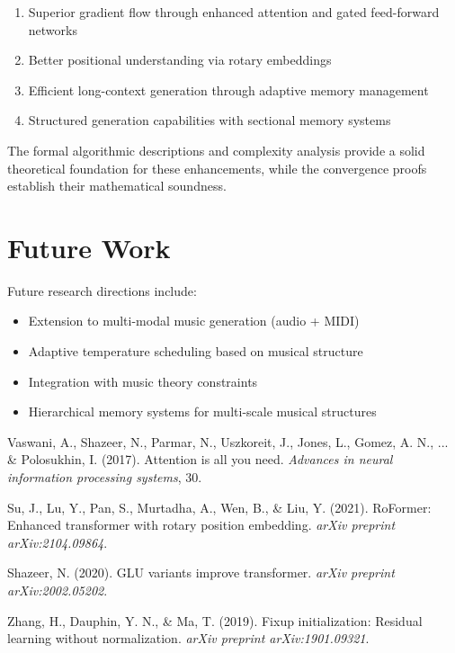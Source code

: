 \documentclass[12pt]{article}
\theoremstyle{definition}
\begin{document}
\begin{enumerate}
\item Superior gradient flow through enhanced attention and gated feed-forward networks
\item Better positional understanding via rotary embeddings
\item Efficient long-context generation through adaptive memory management
\item Structured generation capabilities with sectional memory systems
\end{enumerate}

The formal algorithmic descriptions and complexity analysis provide a solid theoretical foundation for these enhancements, while the convergence proofs establish their mathematical soundness.

\section{Future Work}

Future research directions include:
\begin{itemize}
\item Extension to multi-modal music generation (audio + MIDI)
\item Adaptive temperature scheduling based on musical structure
\item Integration with music theory constraints
\item Hierarchical memory systems for multi-scale musical structures
\end{itemize}


\begin{thebibliography}{9}

Vaswani, A., Shazeer, N., Parmar, N., Uszkoreit, J., Jones, L., Gomez, A. N., ... \& Polosukhin, I. (2017).
Attention is all you need.
\textit{Advances in neural information processing systems}, 30.

Su, J., Lu, Y., Pan, S., Murtadha, A., Wen, B., \& Liu, Y. (2021).
RoFormer: Enhanced transformer with rotary position embedding.
\textit{arXiv preprint arXiv:2104.09864}.

Shazeer, N. (2020).
GLU variants improve transformer.
\textit{arXiv preprint arXiv:2002.05202}.

Zhang, H., Dauphin, Y. N., \& Ma, T. (2019).
Fixup initialization: Residual learning without normalization.
\textit{arXiv preprint arXiv:1901.09321}.

\end{thebibliography}
\end{document}
